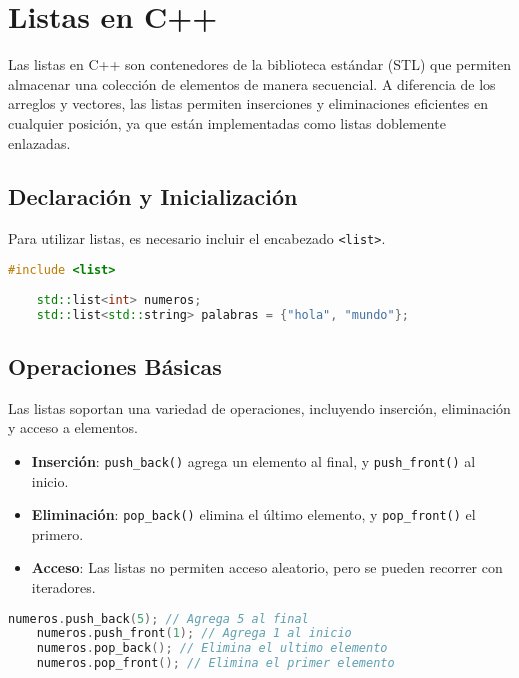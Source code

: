 
    \section{Listas en C++}
    
    Las listas en C++ son contenedores de la biblioteca estándar (STL) que permiten almacenar una colección de elementos de manera secuencial. A diferencia de los arreglos y vectores, las listas permiten inserciones y eliminaciones eficientes en cualquier posición, ya que están implementadas como listas doblemente enlazadas.
    
    \subsection{Declaración y Inicialización}
    
    Para utilizar listas, es necesario incluir el encabezado \texttt{<list>}.
    
    \begin{lstlisting}[language=C++]
    #include <list>
    
    std::list<int> numeros;
    std::list<std::string> palabras = {"hola", "mundo"};
    \end{lstlisting}
    
    \subsection{Operaciones Básicas}
    
    Las listas soportan una variedad de operaciones, incluyendo inserción, eliminación y acceso a elementos.
    
    \begin{itemize}
        \item \textbf{Inserción}: \texttt{push\_back()} agrega un elemento al final, y \texttt{push\_front()} al inicio.
        \item \textbf{Eliminación}: \texttt{pop\_back()} elimina el último elemento, y \texttt{pop\_front()} el primero.
        \item \textbf{Acceso}: Las listas no permiten acceso aleatorio, pero se pueden recorrer con iteradores.
    \end{itemize}
    
    \begin{lstlisting}[language=C++]
    numeros.push_back(5); // Agrega 5 al final
    numeros.push_front(1); // Agrega 1 al inicio
    numeros.pop_back(); // Elimina el ultimo elemento
    numeros.pop_front(); // Elimina el primer elemento
    \end{lstlisting}
    
